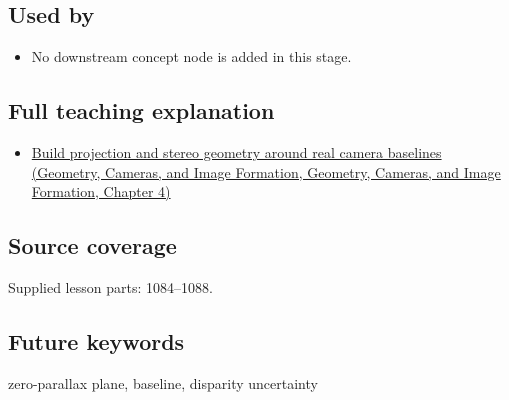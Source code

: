\subsection{Used by}\label{appendix-0976e86e5b9f-used-by}

\begin{itemize}
\tightlist
\item
  No downstream concept node is added in this stage.
\end{itemize}

\subsection{Full teaching explanation}\label{appendix-0976e86e5b9f-full-teaching-explanation}

\begin{itemize}
\tightlist
\item
  \href{../03-Geometry-Cameras-and-Image-Formation/main.pdf\#nameddest=02-foundations-ii-ch035-build-projection-and-stereo-geometry-around-real-camera-baselines}{Build projection and stereo geometry around real camera baselines (Geometry, Cameras, and Image Formation, Geometry, Cameras, and Image Formation, Chapter 4)}
\end{itemize}

\subsection{Source coverage}\label{appendix-0976e86e5b9f-source-coverage}

Supplied lesson parts: 1084--1088.

\subsection{Future keywords}\label{appendix-0976e86e5b9f-future-keywords}

zero-parallax plane, baseline, disparity uncertainty

